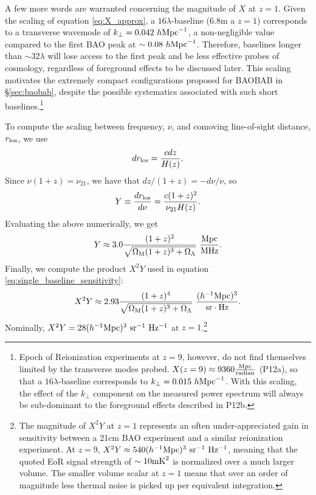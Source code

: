 \documentclass[10pt,iop]{emulateapj}
\begin{document}
A few more words are warranted concerning the magnitude of $X$ at $z=1$.  Given the scaling of equation \ref{eq:X_approx},
a $16\lambda$-baseline (6.8m a $z=1$) corresponds to a transverse wavemode of 
$k_\perp = 0.042~h\rm{Mpc}^{-1}$, a non-negligible value compared to the first BAO peak at 
$\sim 0.08~h\rm{Mpc}^{-1}$.  Therefore, baselines longer than $\sim 32\lambda$ will 
lose access to the first peak and be less effective
probes of cosmology, regardless of foreground effects to be discussed later.  This scaling
motivates the extremely compact configurations proposed for BAOBAB in \S\ref{sec:baobab}, despite
the possible systematics associated with such short 
baselines.\footnote{Epoch of Reionization experiments at $z=9$, however, do not find themselves 
limited by the transverse modes probed. $X(z=9) \approx 9360 \frac{\rm Mpc}{\rm radian}$ (P12a), 
so that a $16\lambda$-baseline corresponds to $k_{\perp} = 0.015~h\rm{Mpc}^{-1}$.  
With this scaling, the effect of the $k_{\perp}$ component on the measured power spectrum will 
always be sub-dominant to the foreground effects described in P12b.}

To compute the scaling between frequency, $\nu$, and comoving line-of-sight distance, $r_{\rm los}$, we use
\begin{equation}
    dr_{\rm los} = \frac{c dz}{H(z)}.
\end{equation}
Since $\nu(1+z)=\nu_{21}$, we have that $dz/(1+z)=-d\nu/\nu$, so
\begin{equation}
\label{eq:Y}
    Y\equiv\frac{dr_{\rm los}}{d\nu}=\frac{c(1+z)^2}{\nu_{21} H(z)}.
\end{equation}
Evaluating the above numerically, we get
\begin{equation}
    Y\approx3.0\frac{(1+z)^2}{\sqrt{\Omega_{\rm M}(1+z)^3+\Omega_\Lambda}}\ \frac{\rm Mpc}{\rm MHz}.
\end{equation}
Finally, we compute the product $X^2Y$ used in equation \ref{eq:single_baseline_sensitivity}:
\begin{equation}
    X^2Y\approx2.93\frac{(1+z)^4}{\sqrt{\Omega_{\rm M}(1+z)^3+\Omega_\Lambda}}\ \frac{{(h^{-1}\rm Mpc})^3}{{\rm sr}\cdot{\rm Hz}}.
\label{eq:cosmo_scaling}
\end{equation}
Nominally, $X^2Y=28 (h^{-1}\rm{Mpc)^3~sr^{-1}~Hz^{-1}}$
 at $z=1$.\footnote{The magnitude of $X^2Y$ at $z=1$ represents 
an often under-appreciated gain in sensitivity between a 21cm BAO experiment and a similar
reionization experiment.  At $z=9$, $X^2Y \approx 540(h^{-1}\rm{Mpc)^3~sr^{-1}~Hz^{-1}}$, 
meaning that the quoted EoR signal strength of
$\sim10\rm{mK}^2$ is normalized over a much larger volume.  The smaller volume scalar at $z=1$
means that over an order of magnitude less thermal noise is picked up per equivalent integration.}
\end{document}
